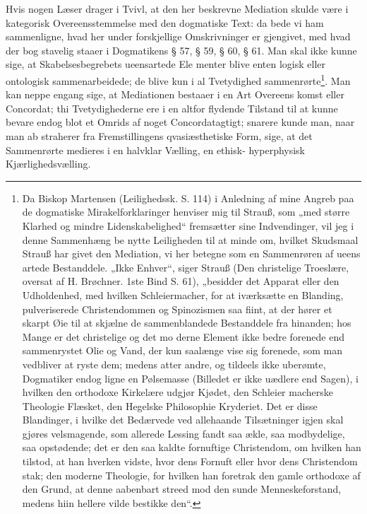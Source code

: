 \documentclass[12pt]{book}
\newcommand{\opage}[1]{\marginnote{\footnotesize\textit{[#1]}}}
\begin{document}
Hvis nogen Læser drager i Tvivl, at den her beskrevne
Mediation skulde være i kategorisk Overeensstemmelse med den
dogmatiske Text: da bede vi ham sammenligne, hvad her under
forskjellige Omskrivninger er gjengivet, med hvad der bog\-%
stavelig staaer i Dogmatikens § 57, § 59, § 60, § 61. Man
\opage{100}\setcounter{footnote}{0}%
skal ikke kunne sige, at Skabelsesbegrebets ueensartede Ele\-%
menter blive enten logisk eller ontologisk sammenarbeidede;
de blive kun i al Tvetydighed sammenrørte\footnote{Da Biskop Martensen (Leilighedssk. S. 114) i Anledning af mine
Angreb paa de dogmatiske Mirakelforklaringer henviser mig til
Strauß, som „med større Klarhed og mindre Lidenskabelighed“
fremsætter sine Indvendinger, vil jeg i denne Sammenhæng be\-%
nytte Leiligheden til at minde om, hvilket Skudsmaal Strauß har
givet den Mediation, vi her betegne som en Sammenrøren af ueens\-%
artede Bestanddele. „Ikke Enhver“, siger Strauß (Den christelige
Troeslære, oversat af H. Brøchner. 1ste Bind S. 61), „besidder det
Apparat eller den Udholdenhed, med hvilken Schleiermacher, for at
iværksætte en Blanding, pulveriserede Christendommen og Spinozismen
saa fiint, at der hører et skarpt Øie til at skjælne de sammenblandede
Bestanddele fra hinanden; hos Mange er det christelige og det mo\-%
derne Element ikke bedre forenede end sammenrystet Olie og Vand,
der kun saalænge vise sig forenede, som man vedbliver at ryste
dem; medens atter andre, og tildeels ikke uberømte, Dogmatiker
endog ligne en Pølsemasse (Billedet er ikke uædlere end Sagen),
i hvilken den orthodoxe Kirkelære udgjør Kjødet, den Schleier\-%
macherske Theologie Flæsket, den Hegelske Philosophie Kryderiet.
Det er disse Blandinger, i hvilke det Bedærvede ved allehaande
Tilsætninger igjen skal gjøres velsmagende, som allerede Lessing
fandt saa ækle, saa modbydelige, saa opstødende; det er den saa\-%
kaldte fornuftige Christendom, om hvilken han tilstod, at han
hverken vidste, hvor dens Fornuft eller hvor dens Christendom
stak; den moderne Theologie, for hvilken han foretrak den gamle
orthodoxe af den Grund, at denne aabenbart streed mod den sunde
Menneskeforstand, medens hiin hellere vilde bestikke den“.}. Man kan
neppe engang sige, at Mediationen bestaaer i en Art Overeens\-%
komst eller Concordat; thi Tvetydighederne ere i en altfor
flydende Tilstand til at kunne bevare endog blot et Omrids
af noget Concordatagtigt; snarere kunde man, naar man ab\-%
straherer fra Fremstillingens qvasiæsthetiske Form, sige, at det
\opage{101}\setcounter{footnote}{0}%
Sammenrørte medieres i en halvklar Vælling, en ethisk-%
hyperphysisk Kjærlighedsvælling.
\end{document}
